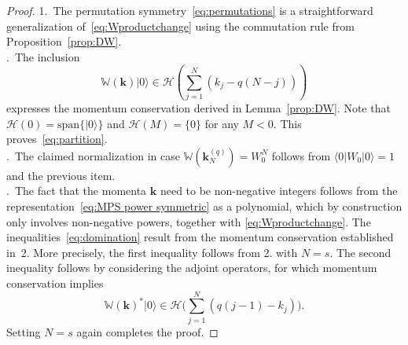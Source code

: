 \documentclass[letterpaper, DIV=17]{scrartcl}
\numberwithin{equation}{section}
\theoremstyle{definition}
\begin{document}
\begin{proof}
	1.~The permutation symmetry~\eqref{eq:permutations}  is a straightforward generalization of~\eqref{eq:Wproductchange} using the commutation rule from Proposition~\eqref{prop:DW}. \\
.~The  inclusion 
	$$  \mathbb{W}(\mathbf{k}) \vert 0 \rangle \in \mathcal{H}\left( \sum_{j=1}^N ( k_j  - q(N-j) ) \right) $$ 
	expresses the momentum conservation derived in Lemma~\ref{prop:DW}. Note that $ \mathcal{H}\left(0\right) = \text{span}\{ \vert 0 \rangle \} $ and $ \mathcal{H}\left(M\right) = \{ 0 \} $ for any $ M < 0 $. This  proves~\eqref{eq:partition}. \\
	.~The claimed normalization in case $ \mathbb{W}\left( \mathbf{k}^{(q)}_N\right) = W_0^N $ follows from $ \langle 0 | W_0 | 0 \rangle = 1 $ and the previous item. \\
		.~The fact that the momenta  $  \mathbf{k} $ need to be non-negative integers follows from the 
	representation~\eqref{eq:MPS power symmetric} as a polynomial, which by construction only involves non-negative powers, together with \eqref{eq:Wproductchange}. 
	The inequalities~\eqref{eq:domination} result from the momentum conservation established in~2. More precisely, the first inequality follows from 2. with $ N = s $. The second inequality follows by considering the adjoint operators, for which momentum conservation implies 
	 $$ \mathbb{W}(\mathbf{k})^* \vert 0 \rangle \in \mathcal{H}\big(\sum_{j=1}^N (q(j-1)-k_j)\big)  . $$
	Setting $ N = s $ again completes the proof. 
\end{proof}
\end{document}
